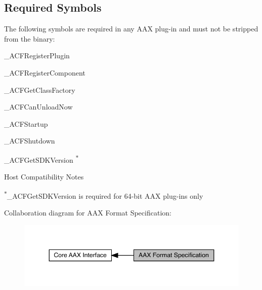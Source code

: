  \hypertarget{a00801_commoninterface_formatspecification__required_symbols}{}\subsection{Required Symbols}\label{a00801_commoninterface_formatspecification__required_symbols}
The following symbols are required in any A\+AX plug-\/in and must not be stripped from the binary\+: 
\begin{DoxyItemize}
\item {\ttfamily \+\_\+\+A\+C\+F\+Register\+Plugin } 
\item {\ttfamily \+\_\+\+A\+C\+F\+Register\+Component } 
\item {\ttfamily \+\_\+\+A\+C\+F\+Get\+Class\+Factory } 
\item {\ttfamily \+\_\+\+A\+C\+F\+Can\+Unload\+Now } 
\item {\ttfamily \+\_\+\+A\+C\+F\+Startup } 
\item {\ttfamily \+\_\+\+A\+C\+F\+Shutdown } 
\item {\ttfamily \+\_\+\+A\+C\+F\+Get\+S\+D\+K\+Version }\textsuperscript{$\ast$} 
\end{DoxyItemize}

 \begin{DoxyRefDesc}{Host Compatibility Notes}
\item[\mbox{\hyperlink{a00786__compatibility_notes000006}{Host Compatibility Notes}}]\textsuperscript{$\ast$}{\ttfamily \+\_\+\+A\+C\+F\+Get\+S\+D\+K\+Version} is required for 64-\/bit A\+AX plug-\/ins only\end{DoxyRefDesc}


 Collaboration diagram for A\+AX Format Specification\+:
\nopagebreak
\begin{figure}[H]
\begin{center}
\leavevmode
\includegraphics[width=348pt]{a00801}
\end{center}
\end{figure}
